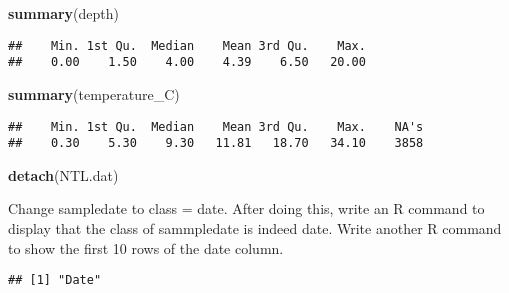 \documentclass[]{article}
\newenvironment{Shaded}{\begin{snugshade}}{\end{snugshade}}
\newcommand{\KeywordTok}[1]{\textcolor[rgb]{0.13,0.29,0.53}{\textbf{#1}}}
\newcommand{\DataTypeTok}[1]{\textcolor[rgb]{0.13,0.29,0.53}{#1}}
\newcommand{\DecValTok}[1]{\textcolor[rgb]{0.00,0.00,0.81}{#1}}
\newcommand{\StringTok}[1]{\textcolor[rgb]{0.31,0.60,0.02}{#1}}
\newcommand{\OperatorTok}[1]{\textcolor[rgb]{0.81,0.36,0.00}{\textbf{#1}}}
\newcommand{\NormalTok}[1]{#1}
\begin{document}
\begin{Shaded}
\begin{Highlighting}[]
\KeywordTok{summary}\NormalTok{(depth)}
\end{Highlighting}
\end{Shaded}

\begin{verbatim}
##    Min. 1st Qu.  Median    Mean 3rd Qu.    Max. 
##    0.00    1.50    4.00    4.39    6.50   20.00
\end{verbatim}

\begin{Shaded}
\begin{Highlighting}[]
\KeywordTok{summary}\NormalTok{(temperature_C)}
\end{Highlighting}
\end{Shaded}

\begin{verbatim}
##    Min. 1st Qu.  Median    Mean 3rd Qu.    Max.    NA's 
##    0.30    5.30    9.30   11.81   18.70   34.10    3858
\end{verbatim}

\begin{Shaded}
\begin{Highlighting}[]
\KeywordTok{detach}\NormalTok{(NTL.dat)}
\end{Highlighting}
\end{Shaded}

Change sampledate to class = date. After doing this, write an R command
to display that the class of sammpledate is indeed date. Write another R
command to show the first 10 rows of the date column.

\begin{Shaded}
\end{Shaded}

\begin{verbatim}
## [1] "Date"
\end{verbatim}

\begin{Shaded}
\end{Shaded}
\end{document}
